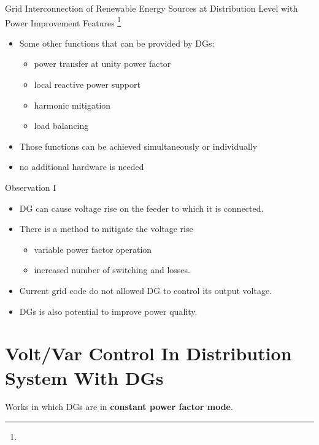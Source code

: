\documentclass[10pt]{beamer}
\begin{document}
\begin{frame} {Grid Interconnection of Renewable Energy Sources at Distribution Level with Power Improvement Features \footnote{}}
\begin{itemize}
\item Some other functions that can be provided by DGs:
\begin{itemize}
\item power transfer at unity power factor
\item local reactive power support
\item harmonic mitigation
\item load balancing
\end{itemize}
\item Those functions can be achieved simultaneously or individually
\item no additional hardware is needed
\end{itemize}
\end{frame}



\begin{frame}{Observation I}
\begin{itemize}
\item DG can cause voltage rise on the feeder to which it is connected.
\item There is a method to mitigate the voltage rise 
   \begin{itemize}
    \item variable power factor operation
    \item increased number of switching and losses.
    \end{itemize}
\item Current grid code do not allowed DG to control its output voltage.
\item DGs is also potential to improve power quality.
\end{itemize}
\end{frame}



\section{Volt/Var Control In Distribution System With DGs}

\begin{frame}
\begin{center}
\huge
Works in which DGs are in \textbf{constant power factor mode}.
\end{center}
\end{frame}
\end{document}

